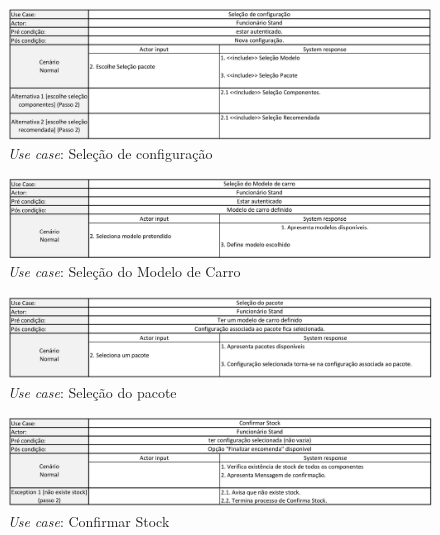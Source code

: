 \begin{figure}[ht]
    \centering
    \includegraphics[width=\textwidth]{analise_de_requisitos/img/use_cases/selecao_configuracao.png}
    \caption{\textit{Use case}: Seleção de configuração}
    \label{fig:uc_selecao_configuracao}
\end{figure}

\begin{figure}[ht]
    \centering
    \includegraphics[width=\textwidth]{analise_de_requisitos/img/use_cases/selecao_modelo_carro.png}
    \caption{\textit{Use case}: Seleção do Modelo de Carro}
    \label{fig:uc_selecao_modelo_carro}
\end{figure}

\begin{figure}[ht]
    \centering
    \includegraphics[width=\textwidth]{analise_de_requisitos/img/use_cases/selecao_pacote.png}
    \caption{\textit{Use case}: Seleção do pacote}
    \label{fig:uc_selecao_pacote}
\end{figure}

\begin{figure}[ht]
    \centering
    \includegraphics[width=\textwidth]{analise_de_requisitos/img/use_cases/confirmar_stock.png}
    \caption{\textit{Use case}: Confirmar Stock}
    \label{fig:uc_confirmar_stock}
\end{figure}

